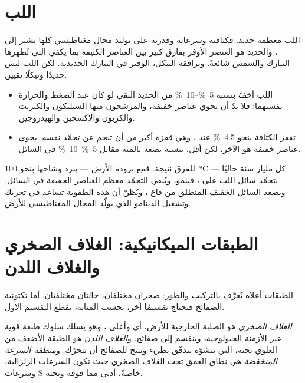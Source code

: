 \section{اللب}

اللب معظمه حديد. فكثافته وسرعاته وقدرته على توليد مجال مغناطيسي كلها تشير إلى ، والحديد هو العنصر الأوفر بفارق كبير بين العناصر الكثيفة بما يكفي التي تُظهرها النيازك والشمس شائعةً. ويرافقه النيكل، الوفير في النيازك الحديدية. لكن اللب ليس حديدًا ونيكلًا نقيين.
\begin{itemize}
  \item اللب أخفّ بنسبة \qtyrange{5}{10}{\percent} من الحديد النقي لو كان عند الضغط والحرارة نفسيهما: فلا بدّ أن يحوي عناصر خفيفة، والمرشحون منها السيليكون والكبريت والكربون والأكسجين والهيدروجين.
  \item تقفز الكثافة بنحو \qty{4.5}{\percent} عند ، وهي قفزة أكبر من أن تنجم عن تجمّد  نفسه:  يحوي عناصر خفيفة هو الآخر، لكن أقل، بنسبة بضعة بالمئة مقابل \qtyrange{5}{10}{\percent} في السائل.
\end{itemize}
للفرق نتيجة. فمع برودة الأرض — يبرد وشاحها بنحو \qty{100}{\degreeCelsius} كل مليار سنة حاليًا — يتجمّد سائل اللب على ، فينمو، ويُبقي التجمّد معظم العناصر الخفيفة في السائل.
ويصعد السائل الخفيف المنطلق من قاع ، ويُظنّ أن هذه الطفوية تساعد في تحريك  وتشغيل الدينامو الذي يولّد المجال المغناطيسي للأرض.

\section{الطبقات الميكانيكية: الغلاف الصخري والغلاف اللدن}

الطبقات أعلاه تُعرَّف بالتركيب والطور:   صخران مختلفان،   حالتان مختلفتان. أما تكتونية الصفائح فتحتاج تقسيمًا آخر، بحسب المتانة، يقطع التقسيم الأول.

\begin{definition}
\label{def:b1:layered-earth:lithosphere}
\emph{الغلاف الصخري} هو  الصلبة الخارجية للأرض، أي  وأعلى ، وهو يسلك سلوك طبقة قوية عبر الأزمنة الجيولوجية، وينقسم إلى صفائح. و\emph{الغلاف اللدن} هو الطبقة الأضعف من  العلوي تحته، التي تتشوّه بتدفّق بطيء وتتيح للصفائح أن تتحرّك. و\emph{منطقة السرعة المنخفضة} هي نطاق العمق تحت الغلاف الصخري حيث تكون السرعات الزلزالية، وسرعات S خاصةً، أدنى مما فوقه وتحته.
\end{definition}

